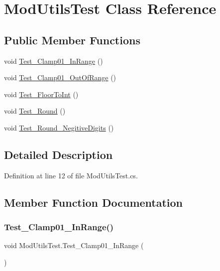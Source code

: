 \hypertarget{class_mod_utils_test}{}\section{Mod\+Utils\+Test Class Reference}
\label{class_mod_utils_test}
\subsection*{Public Member Functions}
\begin{DoxyCompactItemize}
\item 
void \hyperlink{class_mod_utils_test_a3b71b27e6cc27b25c188552f5de89fa1}{Test\+\_\+\+Clamp01\+\_\+\+In\+Range} ()
\item 
void \hyperlink{class_mod_utils_test_ac997bf566d67fcdb1231d4629f1d5671}{Test\+\_\+\+Clamp01\+\_\+\+Out\+Of\+Range} ()
\item 
void \hyperlink{class_mod_utils_test_a060091d3a455dec00e2005ee3a94b4b9}{Test\+\_\+\+Floor\+To\+Int} ()
\item 
void \hyperlink{class_mod_utils_test_a08b6eb206f1e2545498d6a94fa366128}{Test\+\_\+\+Round} ()
\item 
void \hyperlink{class_mod_utils_test_ac373bf7be6986cc8adc0a03eda50ee79}{Test\+\_\+\+Round\+\_\+\+Negitive\+Digits} ()
\end{DoxyCompactItemize}


\subsection{Detailed Description}


Definition at line 12 of file Mod\+Utils\+Test.\+cs.



\subsection{Member Function Documentation}
\mbox{\label{class_mod_utils_test_a3b71b27e6cc27b25c188552f5de89fa1}} 
\subsubsection{\texorpdfstring{Test\+\_\+\+Clamp01\+\_\+\+In\+Range()}{Test\_Clamp01\_InRange()}}
{\footnotesize\ttfamily void Mod\+Utils\+Test.\+Test\+\_\+\+Clamp01\+\_\+\+In\+Range (\begin{DoxyParamCaption}{ }\end{DoxyParamCaption})}



